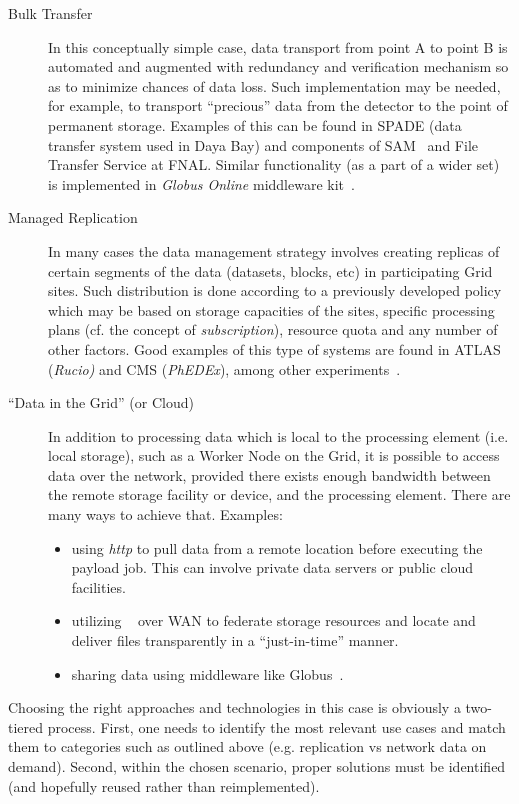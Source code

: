 \begin{description}
\item[Bulk Transfer] In this conceptually simple case, data transport from point A to point B is automated and augmented
with redundancy and verification mechanism so as to minimize chances of data loss. Such implementation may be needed,
for example, to transport ``precious'' data from the detector to the point of permanent storage.
Examples of this can be found in SPADE (data transfer system used in Daya Bay) and components of SAM~\cite{SAM} and File Transfer Service at FNAL.
Similar functionality (as a part of a wider set) is implemented in \textit{Globus Online} middleware kit~\cite{globus}.

\item[Managed Replication] In many cases the data management strategy involves creating replicas of certain segments of the data (datasets, blocks, etc)
in participating Grid sites. Such distribution is done according to a previously developed policy which may be based on storage capacities of 
the sites, specific processing plans (cf. the concept of \textit{subscription}), resource quota and any number of other factors. Good examples of this type of systems are found in
ATLAS (\textit{Rucio)} and CMS (\textit{PhEDEx}), among other experiments~\cite{rucio_chep13,phedex_chep09}.

\item[``Data in the Grid'' (or Cloud)] In addition to processing data which is local to the processing element (i.e. local storage), such as a Worker Node
on the Grid, it is possible to access data over the network, provided there exists enough bandwidth between the remote storage
facility or device, and the processing element. There are many ways to achieve that. Examples:
\begin{itemize}
\item using \textit{http} to pull data from a remote location before executing the payload job. This can involve private data servers or public cloud facilities.
\item utilizing \xrootd~\cite{xrootd,xrootd_web} over WAN to federate storage resources and locate and deliver files transparently in a ``just-in-time'' manner.
\item sharing data using middleware like Globus~\cite{globus}.
\end{itemize}

\end{description}


Choosing the right approaches and technologies in this case is obviously a two-tiered process. First, one needs to identify the most
 relevant use cases and match them to categories such as outlined above (e.g. replication vs network data on demand). Second, within
 the chosen scenario, proper solutions must be identified (and hopefully reused rather than reimplemented).
   

